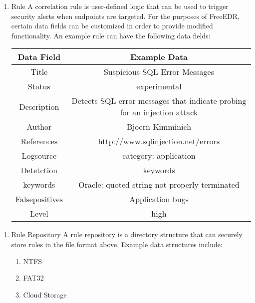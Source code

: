 \documentclass{scrreprt}
\begin{document}
\begin{enumerate}[resume*]
    \item Rule
	\subitem A correlation rule is user-defined logic that can be used to trigger security alerts when endpoints are targeted. For the purposes of FreeEDR, certain data fields can be customized in order to provide modified functionality. An example rule can have the following data fields:
	\subitem	
 	\begin{tabular}{|c|c|}
        \hline
         \textbf{Data Field} & \textbf{Example Data}\\
        \hline
	Title & Suspicious SQL Error Messages\\
	\hline
	Status & experimental\\
\hline
Description& Detects SQL error messages that indicate probing for an injection attack\\
\hline
Author & Bjoern Kimminich\\
\hline
References & http://www.sqlinjection.net/errors\\
\hline
Logsource &  category: application\\
\hline
Detetction & keywords\\
\hline
keywords & Oracle: quoted string not properly terminated\\
\hline
Falsepositives &  Application bugs\\
\hline
Level & high\\
\hline
\end{tabular}
\end{enumerate}

\begin{enumerate}[resume*]
    \item Rule Repository
	\subitem A rule repository is a directory structure that can securely store rules in the file format above. Example data structures include: 
    \begin{enumerate}[label*=\arabic*.]
	\item NTFS
	\item FAT32
	\item Cloud Storage
\end{enumerate}
\end{enumerate}
\end{document}
